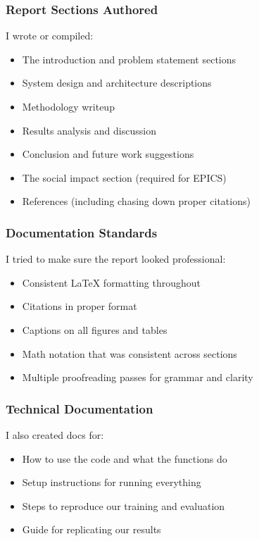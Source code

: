 \documentclass[12pt]{article}
\begin{document}
\subsubsection{Report Sections Authored}
I wrote or compiled:
\begin{itemize}
    \item The introduction and problem statement sections
    \item System design and architecture descriptions
    \item Methodology writeup
    \item Results analysis and discussion
    \item Conclusion and future work suggestions
    \item The social impact section (required for EPICS)
    \item References (including chasing down proper citations)
\end{itemize}

\subsubsection{Documentation Standards}
I tried to make sure the report looked professional:
\begin{itemize}
    \item Consistent LaTeX formatting throughout
    \item Citations in proper format
    \item Captions on all figures and tables
    \item Math notation that was consistent across sections
    \item Multiple proofreading passes for grammar and clarity
\end{itemize}

\subsubsection{Technical Documentation}
I also created docs for:
\begin{itemize}
    \item How to use the code and what the functions do
    \item Setup instructions for running everything
    \item Steps to reproduce our training and evaluation
    \item Guide for replicating our results
\end{itemize}
\end{document}
